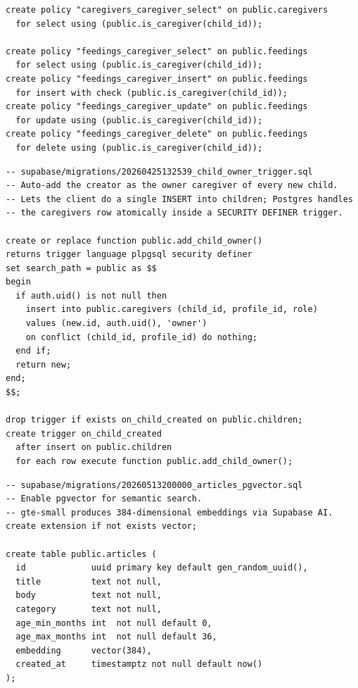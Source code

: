 \documentclass[%
  ukrainian, utf8, columnvii, simple,
  hpadding=10mm, vpadding=10mm, reduceheight=2mm,
  floatsection,
]{eskdtext}
\begin{document}
{\begin{verbatim}
create policy "caregivers_caregiver_select" on public.caregivers
  for select using (public.is_caregiver(child_id));

create policy "feedings_caregiver_select" on public.feedings
  for select using (public.is_caregiver(child_id));
create policy "feedings_caregiver_insert" on public.feedings
  for insert with check (public.is_caregiver(child_id));
create policy "feedings_caregiver_update" on public.feedings
  for update using (public.is_caregiver(child_id));
create policy "feedings_caregiver_delete" on public.feedings
  for delete using (public.is_caregiver(child_id));
\end{verbatim}

\begin{verbatim}
-- supabase/migrations/20260425132539_child_owner_trigger.sql
-- Auto-add the creator as the owner caregiver of every new child.
-- Lets the client do a single INSERT into children; Postgres handles
-- the caregivers row atomically inside a SECURITY DEFINER trigger.

create or replace function public.add_child_owner()
returns trigger language plpgsql security definer
set search_path = public as $$
begin
  if auth.uid() is not null then
    insert into public.caregivers (child_id, profile_id, role)
    values (new.id, auth.uid(), 'owner')
    on conflict (child_id, profile_id) do nothing;
  end if;
  return new;
end;
$$;

drop trigger if exists on_child_created on public.children;
create trigger on_child_created
  after insert on public.children
  for each row execute function public.add_child_owner();
\end{verbatim}

\begin{verbatim}
-- supabase/migrations/20260513200000_articles_pgvector.sql
-- Enable pgvector for semantic search.
-- gte-small produces 384-dimensional embeddings via Supabase AI.
create extension if not exists vector;

create table public.articles (
  id             uuid primary key default gen_random_uuid(),
  title          text not null,
  body           text not null,
  category       text not null,
  age_min_months int  not null default 0,
  age_max_months int  not null default 36,
  embedding      vector(384),
  created_at     timestamptz not null default now()
);


\end{verbatim}}
\end{document}
